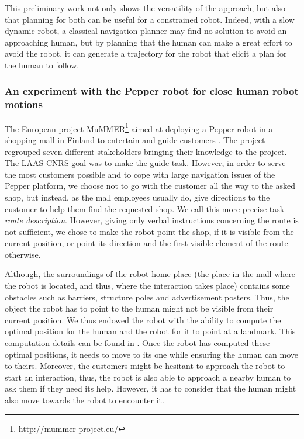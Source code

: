 \documentclass[a4paper,11pt,twoside]{StyleThese}
\begin{document}
This preliminary work not only shows the versatility of the approach, but also that planning for both can be useful for a constrained robot. Indeed, with a slow dynamic robot, a classical navigation planner may find no solution to avoid an approaching human, but by planning that the human can make a great effort to avoid the robot, it can generate a trajectory for the robot that elicit a plan for the human to follow.

\subsubsection{An experiment with the Pepper robot for close human robot motions}
The European project MuMMER\footnote{\url{http://mummer-project.eu/}} aimed at deploying a Pepper robot in a shopping mall in Finland to entertain and guide customers \cite{foster2019mummer}. The project regrouped seven different stakeholders bringing their knowledge to the project. The LAAS-CNRS goal was to make the guide task. However, in order to serve the most customers possible and to cope with large navigation issues of the Pepper platform, we choose not to go with the customer all the way to the asked shop, but instead, as the mall employees usually do, give directions to the customer to help them find the requested shop. We call this more precise task \textit{route description}.
However, giving only verbal instructions concerning the route is not sufficient, we chose to make the robot point the shop, if it is visible from the current position, or point its direction and the first visible element of the route otherwise.

Although, the surroundings of the robot home place (the place in the mall where the robot is located, and thus, where the interaction takes place) contains some obstacles such as barriers, structure poles and advertisement posters. Thus, the object the robot has to point to the human might not be visible from their current position. We thus endowed the robot with the ability to compute the optimal position for the human and the robot for it to point at a landmark. This computation details can be found in \cite{waldhart_reasoning_shared_2019}. Once the robot has computed these optimal positions, it needs to move to its one while ensuring the human can move to theirs. Moreover, the customers might be hesitant to approach the robot to start an interaction, thus, the robot is also able to approach a nearby human to ask them if they need its help. However, it has to consider that the human might also move towards the robot to encounter it.
\end{document}
